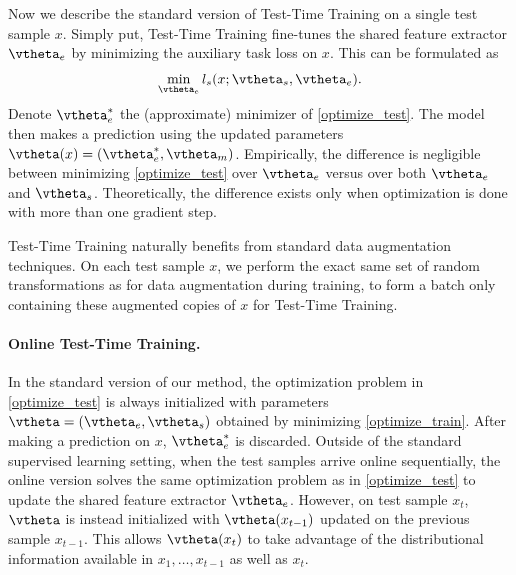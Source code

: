 Now we describe the standard version of Test-Time Training on a single test sample $x$.
Simply put, Test-Time Training fine-tunes the shared feature extractor $\vtheta_e$ by minimizing the auxiliary task loss on $x$. 
This can be formulated as
\begin{equation}
    \label{optimize_test}
    \min_{\vtheta_e}l_s(x; \vtheta_s, \vtheta_e).
\end{equation}
Denote $\vtheta_e\opt$ the (approximate) minimizer of \autoref{optimize_test}.
The model then makes a prediction using the updated parameters 
$\vtheta(x) = (\vtheta_e\opt, \vtheta_m)$.
Empirically, the difference is negligible between minimizing \autoref{optimize_test} over $\vtheta_e$ versus over both $\vtheta_e$ and $\vtheta_s$.
Theoretically, the difference exists only when optimization is done with more than one gradient step.

Test-Time Training naturally benefits from standard data augmentation techniques. On each test sample $x$, we perform the exact same set of random transformations as for data augmentation during training, to form a batch only containing these augmented copies of $x$ for Test-Time Training.

\paragraph{Online Test-Time Training.}
In the standard version of our method, the optimization problem in
\autoref{optimize_test} is always initialized with parameters 
$\vtheta = (\vtheta_e,\vtheta_s)$ 
obtained by minimizing \autoref{optimize_train}.
After making a prediction on $x$, $\vtheta_e\opt$ is discarded.
Outside of the standard supervised learning setting, 
when the test samples arrive online sequentially, 
the online version solves the same optimization problem as in \autoref{optimize_test} to update the shared feature extractor $\vtheta_e$.
However, on test sample $x_t$, 
$\vtheta$ is instead initialized with $\vtheta(x_{t-1})$ updated on the previous sample $x_{t-1}$.
This allows $\vtheta(x_t)$ to take advantage of the distributional information available in $x_1, \dots,x_{t-1}$ as well as $x_t$.
